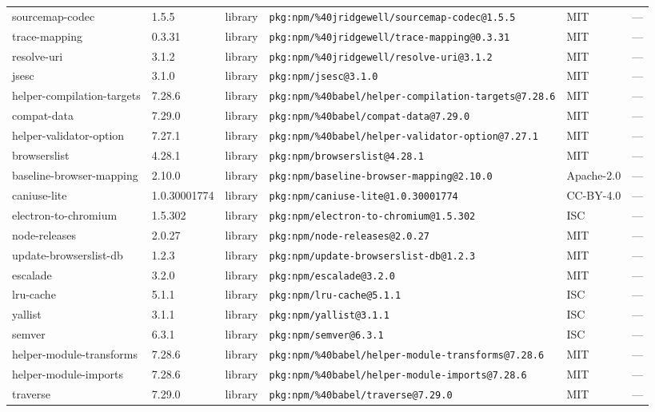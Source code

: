 \documentclass[11pt]{article}
\begin{document}
\begin{longtable}{|l|l|l|p{2.2cm}|l|p{4cm}|}
sourcemap-codec & 1.5.5 & library & \texttt{pkg:npm/\%40jridgewell/sourcemap-codec@1.5.5} & MIT & — \\
trace-mapping & 0.3.31 & library & \texttt{pkg:npm/\%40jridgewell/trace-mapping@0.3.31} & MIT & — \\
resolve-uri & 3.1.2 & library & \texttt{pkg:npm/\%40jridgewell/resolve-uri@3.1.2} & MIT & — \\
jsesc & 3.1.0 & library & \texttt{pkg:npm/jsesc@3.1.0} & MIT & — \\
helper-compilation-targets & 7.28.6 & library & \texttt{pkg:npm/\%40babel/helper-compilation-targets@7.28.6} & MIT & — \\
compat-data & 7.29.0 & library & \texttt{pkg:npm/\%40babel/compat-data@7.29.0} & MIT & — \\
helper-validator-option & 7.27.1 & library & \texttt{pkg:npm/\%40babel/helper-validator-option@7.27.1} & MIT & — \\
browserslist & 4.28.1 & library & \texttt{pkg:npm/browserslist@4.28.1} & MIT & — \\
baseline-browser-mapping & 2.10.0 & library & \texttt{pkg:npm/baseline-browser-mapping@2.10.0} & Apache-2.0 & — \\
caniuse-lite & 1.0.30001774 & library & \texttt{pkg:npm/caniuse-lite@1.0.30001774} & CC-BY-4.0 & — \\
electron-to-chromium & 1.5.302 & library & \texttt{pkg:npm/electron-to-chromium@1.5.302} & ISC & — \\
node-releases & 2.0.27 & library & \texttt{pkg:npm/node-releases@2.0.27} & MIT & — \\
update-browserslist-db & 1.2.3 & library & \texttt{pkg:npm/update-browserslist-db@1.2.3} & MIT & — \\
escalade & 3.2.0 & library & \texttt{pkg:npm/escalade@3.2.0} & MIT & — \\
lru-cache & 5.1.1 & library & \texttt{pkg:npm/lru-cache@5.1.1} & ISC & — \\
yallist & 3.1.1 & library & \texttt{pkg:npm/yallist@3.1.1} & ISC & — \\
semver & 6.3.1 & library & \texttt{pkg:npm/semver@6.3.1} & ISC & — \\
helper-module-transforms & 7.28.6 & library & \texttt{pkg:npm/\%40babel/helper-module-transforms@7.28.6} & MIT & — \\
helper-module-imports & 7.28.6 & library & \texttt{pkg:npm/\%40babel/helper-module-imports@7.28.6} & MIT & — \\
traverse & 7.29.0 & library & \texttt{pkg:npm/\%40babel/traverse@7.29.0} & MIT & — \\

\end{longtable}
\end{document}
